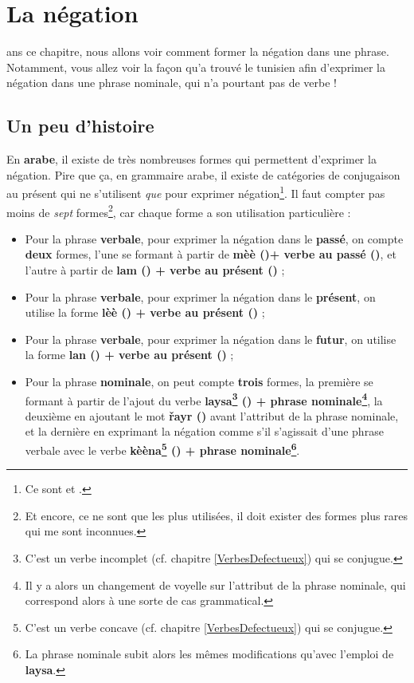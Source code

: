\chapter{La négation}\label{Négation}
ans ce chapitre, nous allons voir comment former la négation dans une phrase. Notamment, vous allez voir la façon qu'a trouvé le tunisien afin  d'exprimer la négation dans une phrase nominale, qui n'a pourtant pas de verbe ! 

\section{Un peu d'histoire}
En \textbf{arabe}, il existe de très nombreuses formes qui permettent d'exprimer la négation. Pire que ça, en grammaire arabe, il existe de catégories de conjugaison au présent qui ne s'utilisent \textit{que} pour exprimer négation\footnote{Ce sont  et .}. Il faut compter pas moins de \textit{sept} formes\footnote{Et encore, ce ne sont que les plus utilisées, il doit exister des formes plus rares qui me sont inconnues.}, car chaque forme a son utilisation particulière :

\begin{itemize}
    \item Pour la phrase \textbf{verbale}, pour exprimer la négation dans le \textbf{passé}, on compte \textbf{deux} formes, l'une se formant à partir de \textbf{mèè ()+ verbe au passé ()}, et l'autre à partir de \textbf{lam () + verbe au présent ()} ;
    \item Pour la phrase \textbf{verbale}, pour exprimer la négation dans le \textbf{présent}, on utilise la forme \textbf{lèè () + verbe au présent ()} ; 
    \item Pour la phrase \textbf{verbale}, pour exprimer la négation dans le \textbf{futur}, on utilise la forme \textbf{lan () + verbe au présent ()} ;
    \item Pour la phrase \textbf{nominale}, on peut compte \textbf{trois} formes, la première se formant à partir de l'ajout du verbe \textbf{laysa\footnote{C'est un verbe incomplet (cf. chapitre \ref{VerbesDefectueux}) qui se conjugue.} () + phrase nominale\footnote{Il y a alors un changement de voyelle sur l'attribut de la phrase nominale, qui correspond alors à une sorte de cas grammatical.}}, la deuxième en ajoutant le mot \textbf{\v{r}ayr ()} avant l'attribut de la phrase nominale, et la dernière en exprimant la négation comme s'il s'agissait d'une phrase verbale avec le verbe \textbf{kèèna\footnote{C'est un verbe concave (cf. chapitre \ref{VerbesDefectueux}) qui se conjugue.} () + phrase nominale\footnote{La phrase nominale subit alors les mêmes modifications qu'avec l'emploi de \textbf{laysa}.}}.
\end{itemize}

